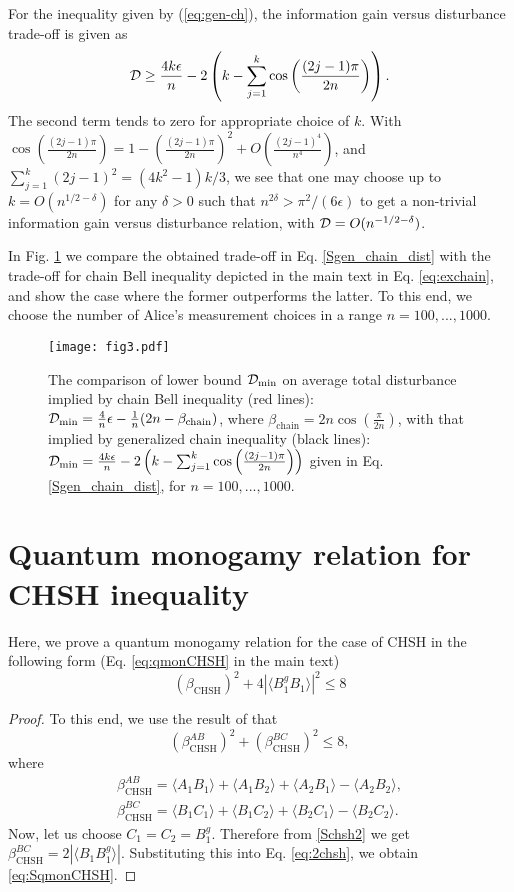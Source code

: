 \documentclass[pra,twocolumn,showpacs,preprintnumbers,amsmath,amssymb,superscriptaddress]{revtex4-1}
\def\be{\begin{equation}}
\def\ee{\end{equation}}
\def\ben{\begin{eqnarray}}
\def\een{\end{eqnarray}}
\def\mt{main text\xspace}
\def\>{\rangle}
\def\<{\langle}
\def\omeas{B_1}
\def\ogentle{B_1^g}
\def\chain{\beta_{\text{chain}}}
\def\dist{{\cal D}}
\begin{document}
\begin{appendix}
For the inequality given by (\ref{eq:gen-ch}), the information gain versus disturbance trade-off is given as
\begin{eqnarray}
\label{Sgen_chain_dist}
\dist \geq \frac{4 k \epsilon}{n} - 2 \left(k - \sum_{j=1}^{k} \cos{\left(\frac{(2j-1) \pi}{2n} \right)}\right).
\end{eqnarray}
The second term tends to zero for appropriate choice of $k$. With $\cos{\left(\frac{(2j-1) \pi}{2n} \right)} = 1 - \left(\frac{(2j-1) \pi}{2n}\right)^2 + O\left(\frac{(2j-1)^4}{n^4}\right)$, and $\sum_{j=1}^k (2j-1)^2 = (4k^2-1)k/3$, 
we see that one may choose up to $k = O(n^{1/2-\delta})$ for any $\delta > 0$ such that $n^{2\delta} > \pi^2/(6 \epsilon)$ to get a non-trivial information gain versus disturbance relation, with $\dist = O(n^{-1/2-\delta})$.  

In Fig. \ref{fig3} we compare the obtained trade-off in Eq. \eqref{Sgen_chain_dist} with the trade-off for chain Bell inequality depicted in the \mt in Eq. \eqref{eq:exchain}, and show the case where the former outperforms the latter. To this end, we choose the number of Alice's measurement choices in a range $n=100,...,1000$.

\begin{figure}[h]
\centering
\texttt{[image: fig3.pdf]}
\caption{The comparison of lower bound $\dist_{\min}$ on average total disturbance implied by chain Bell inequality (red lines): $\dist_{\min} = \frac{4}{n} \epsilon - \frac{1}{n} (2n- \chain)$, where $\chain=2 n \cos(\frac{\pi}{2 n})$, with that implied by generalized chain inequality (black lines): $\dist_{\min} = \frac{4 k \epsilon}{n} - 2 \left(k - \sum_{j=1}^{k} \cos{\left(\frac{(2j-1) \pi}{2n} \right)}\right)$ given in Eq. \eqref{Sgen_chain_dist}, for $n=100,...,1000$.}
\label{fig3}
\end{figure}

\section{Quantum monogamy relation for CHSH inequality}\label{secQMON}

Here, we prove a quantum monogamy relation for the case of CHSH in the following form (Eq. \eqref{eq:qmonCHSH} in the main text)
\be
\label{eq:SqmonCHSH}
\left(\beta_{\text{CHSH}} \right)^2 + 4 |\<\ogentle \omeas\>|^2 \leq 8
\ee
\begin{proof}
To this end, we use the result of \cite{TonerVerstraete2006} that
\be
\label{eq:2chsh}
\left(\beta_{\text{CHSH}}^{AB} \right)^2 +\left(\beta_{\text{CHSH}}^{BC} \right)^2 \leq 8,
\ee
where 
\ben
\label{Schsh1}
\beta_{\text{CHSH}}^{AB} =\< A_1 B_1\> + \< A_1 B_2\> + \< A_2 B_1\> - \< A_2 B_2\>,\\
\label{Schsh2}
\beta_{\text{CHSH}}^{BC}=\< B_1 C_1\> + \< B_1 C_2\> + \< B_2 C_1\> - \< B_2 C_2\>.
\een
Now, let us choose $C_1 = C_2 = \ogentle$. Therefore from \eqref{Schsh2} we get $\beta_{\text{CHSH}}^{BC}=2 |\< B_1 \ogentle\>|$. Substituting this into Eq. \eqref{eq:2chsh}, we obtain \eqref{eq:SqmonCHSH}.
\end{proof}

\end{appendix}


\normalem

\end{document}
